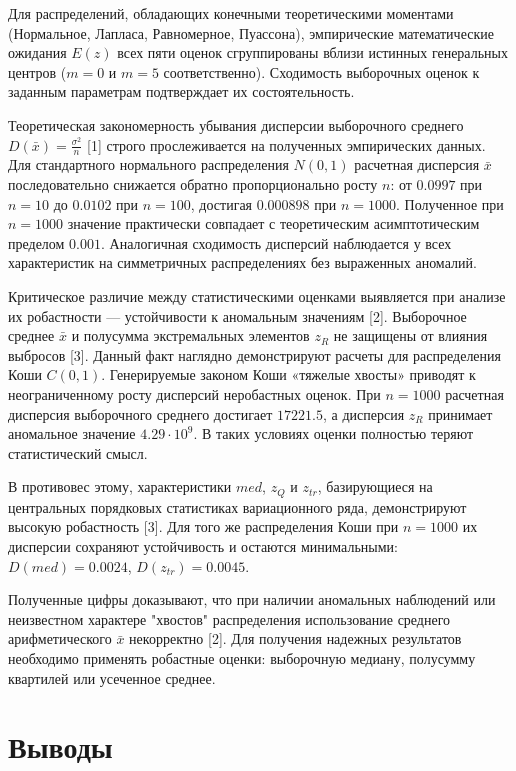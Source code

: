 \documentclass[a4paper, 14pt]{extarticle}
\begin{document}
Для распределений, обладающих конечными теоретическими моментами (Нормальное, Лапласа, Равномерное, Пуассона), эмпирические математические ожидания $E(z)$ всех пяти оценок сгруппированы вблизи истинных генеральных центров ($m=0$ и $m=5$ соответственно). Сходимость выборочных оценок к заданным параметрам подтверждает их состоятельность.

Теоретическая закономерность убывания дисперсии выборочного среднего $D(\bar{x}) = \frac{\sigma^2}{n}$ [1] строго прослеживается на полученных эмпирических данных. Для стандартного нормального распределения $N(0, 1)$ расчетная дисперсия $\bar{x}$ последовательно снижается обратно пропорционально росту $n$: от $0.0997$ при $n=10$ до $0.0102$ при $n=100$, достигая $0.000898$ при $n=1000$. Полученное при $n=1000$ значение практически совпадает с теоретическим асимптотическим пределом $0.001$. Аналогичная сходимость дисперсий наблюдается у всех характеристик на симметричных распределениях без выраженных аномалий.

Критическое различие между статистическими оценками выявляется при анализе их робастности — устойчивости к аномальным значениям [2]. Выборочное среднее $\bar{x}$ и полусумма экстремальных элементов $z_R$ не защищены от влияния выбросов [3]. Данный факт наглядно демонстрируют расчеты для распределения Коши $C(0, 1)$. Генерируемые законом Коши «тяжелые хвосты» приводят к неограниченному росту дисперсий неробастных оценок. При $n=1000$ расчетная дисперсия выборочного среднего достигает $17221.5$, а дисперсия $z_R$ принимает аномальное значение $4.29 \cdot 10^9$. В таких условиях оценки полностью теряют статистический смысл.

В противовес этому, характеристики $med$, $z_Q$ и $z_{tr}$, базирующиеся на центральных порядковых статистиках вариационного ряда, демонстрируют высокую робастность [3]. Для того же распределения Коши при $n=1000$ их дисперсии сохраняют устойчивость и остаются минимальными: $D(med) = 0.0024$, $D(z_{tr}) = 0.0045$. 

Полученные цифры доказывают, что при наличии аномальных наблюдений или неизвестном характере "хвостов" распределения использование среднего арифметического $\bar{x}$ некорректно [2]. Для получения надежных результатов необходимо применять робастные оценки: выборочную медиану, полусумму квартилей или усеченное среднее.

\section{Выводы}
\end{document}
